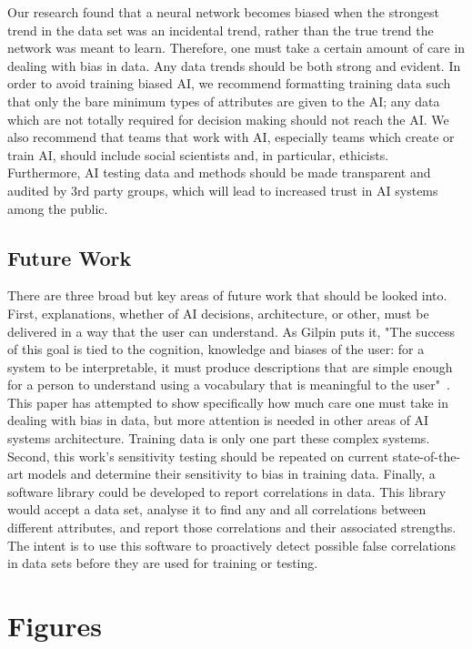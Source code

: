 \documentclass[]{report}
\begin{document}
Our research found that a neural network becomes biased when the strongest trend in the data set was
an incidental trend, rather than the true trend the network was meant to learn. Therefore, one must
take a certain amount of care in dealing with bias in data. Any data trends should be both strong
and evident. In order to avoid training biased AI, we recommend formatting training data such that
only the bare minimum types of attributes are given to the AI; any data which are not totally
required for decision making should not reach the AI. We also recommend that teams that work with
AI, especially teams which create or train AI, should include social scientists and, in particular,
ethicists. Furthermore, AI testing data and methods should be made transparent and audited by 3rd
party groups, which will lead to increased trust in AI systems among the public.

\FloatBarrier
\section{Future Work}

There are three broad but key areas of future work that should be looked into. First, explanations,
whether of AI decisions, architecture, or other, must be delivered in a way that the user can
understand. As Gilpin puts it, "The success of this goal is tied to the cognition, knowledge and
biases of the user: for a system to be interpretable, it must produce descriptions that are simple
enough for a person to understand using a vocabulary that is meaningful to the
user"~\cite{gilpin2018explaining}. This paper has attempted to show specifically how much care one
must take in dealing with bias in data, but more attention is needed in other areas of AI systems
architecture. Training data is only one part these complex systems. Second, this work's sensitivity
testing should be repeated on current state-of-the-art models and determine their sensitivity to
bias in training data. Finally, a software library could be developed to report correlations in
data. This library would accept a data set, analyse it to find any and all correlations between
different attributes, and report those correlations and their associated strengths. The intent is to
use this software to proactively detect possible false correlations in data sets before they are
used for training or testing.




\appendix
\chapter{Figures}
\end{document}
